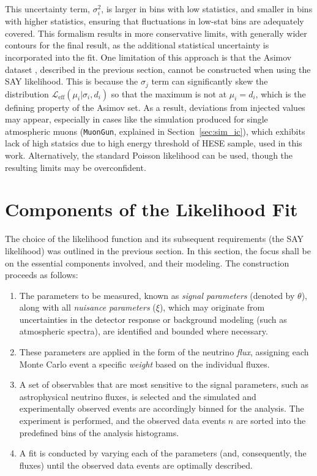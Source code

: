 This uncertainty term, $\sigma_i^2$, is larger in bins with low statistics, and smaller in bins with higher statistics, ensuring that fluctuations in low-stat bins are adequately covered. This formalism results in more conservative limits, with generally wider contours for the final result, as the additional statistical uncertainty is incorporated into the fit. One limitation of this approach is that the Asimov dataset , described in the previous section, cannot be constructed when using the SAY likelihood. This is because the $\sigma_j$ term can significantly skew the distribution $\mathcal{L}_{\text{eff}}(\mu_i | \sigma_i, d_i)$ so that the maximum is not at $\mu_i=d_i$, which is the defining property of the Asimov set. As a result, deviations from injected values may appear, especially in cases like the simulation produced for single atmospheric muons (\texttt{MuonGun}, explained in Section~\ref{sec:sim_ic}), which exhibits lack of high statsics due to high energy threshold of HESE sample, used in this work. Alternatively, the standard Poisson likelihood can be used, though the resulting limits may be overconfident.


\section{Components of the Likelihood Fit}
\label{sec:components}
The choice of the likelihood function and its subsequent requirements (the SAY likelihood)  was outlined in the previous section. In this section, the focus shall be on the essential components involved, and their modeling. The construction proceeds as follows:

\begin{enumerate}
    \item The parameters to be measured, known as \emph{signal parameters} (denoted by $\theta$), along with all \emph{nuisance parameters} ($\xi$), which may originate from uncertainties in the detector response or background modeling (such as atmospheric spectra), are identified and bounded where necessary.
    
    \item These parameters are applied in the form of the neutrino \emph{flux}, assigning each Monte Carlo event a specific \emph{weight} based on the individual fluxes.
    
    \item A set of observables that are most sensitive to the signal parameters, such as astrophysical neutrino fluxes, is selected and the simulated and experimentally observed events are accordingly binned for the analysis. The experiment is performed, and the observed data events $n$ are sorted into the predefined bins of the analysis histograms.
    \
    \item  A fit is conducted by varying each of the parameters (and, consequently, the fluxes) until the observed data events are optimally described. 
\end{enumerate}


